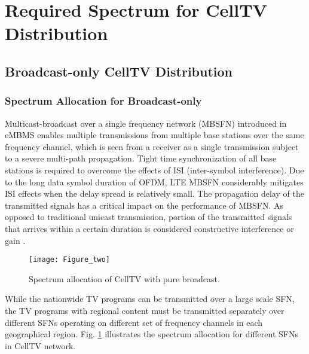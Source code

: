 \documentclass[journal]{IEEEtran}
\begin{document}
\section{Required Spectrum for CellTV Distribution }\label{sec:spectrum}
\subsection{Broadcast-only CellTV Distribution}
\subsubsection{\textbf{Spectrum Allocation for Broadcast-only}}\label{sec:BW_broad}


Multicast-broadcast over a single frequency network (MBSFN) introduced in eMBMS enables multiple transmissions from multiple base stations over the same frequency channel, which is seen from a receiver as a single transmission subject to a severe multi-path propagation. Tight time synchronization of all base stations is required to overcome the effects of ISI (inter-symbol interference). Due to the long data symbol duration of OFDM, LTE MBSFN considerably mitigates ISI effects when the delay spread is relatively small. The propagation delay of the transmitted signals has a critical impact on the performance of MBSFN. As opposed to traditional unicast transmission, portion of the transmitted signals that arrives within a certain duration is considered constructive interference or gain \cite{Rong08}.

\begin{figure}[t]
  \centering
  \texttt{[image: Figure\_two]}\\
  \caption{Spectrum allocation of CellTV with pure broadcast.}\label{fig:broadcast_diag}
\end{figure}

While the nationwide TV programs can be transmitted over a large scale SFN, the TV programs with regional content must be transmitted separately over different SFNs operating on different set of frequency channels in each geographical region. Fig. \ref{fig:broadcast_diag} illustrates the spectrum allocation for different SFNs in CellTV network.
\end{document}

